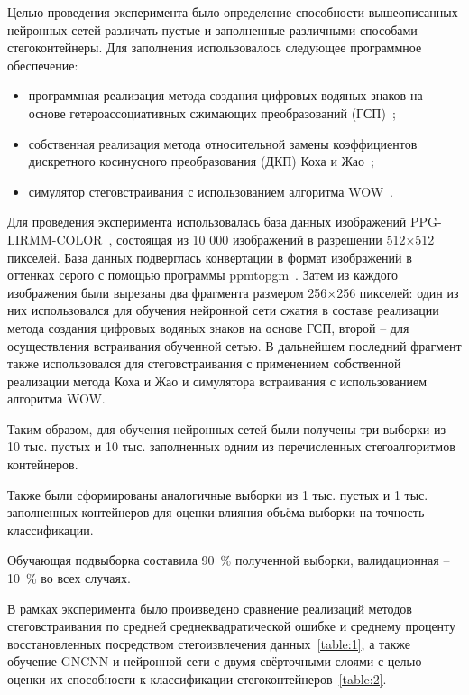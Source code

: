 Целью проведения эксперимента было определение способности вышеописанных нейронных сетей различать пустые и заполненные различными способами стегоконтейнеры. Для заполнения использовалось следующее программное обеспечение:

\begin{itemize}
\item программная реализация метода создания цифровых водяных знаков на основе гетероассоциативных сжимающих преобразований (ГСП)~\cite{SirotaHIC};
\item собственная реализация метода относительной замены коэффициентов дискретного косинусного преобразования (ДКП) Коха и Жао~\cite{ZhaoKoch, KochZhao};
\item симулятор стеговстраивания с использованием алгоритма WOW~\cite{WOW}.
\end{itemize}

Для проведения эксперимента использовалась база данных изображений PPG-LIRMM-COLOR~\cite{PPG-LIRMM-COLOR}, состоящая из 10 000 изображений в разрешении 512×512 пикселей. База данных подверглась конвертации в формат изображений в оттенках серого с помощью программы ppmtopgm~\cite{ppmtopgm}. Затем из каждого изображения были вырезаны два фрагмента размером 256×256 пикселей: один из них использовался для обучения нейронной сети сжатия в составе реализации метода создания цифровых водяных знаков на основе ГСП, второй – для осуществления встраивания обученной сетью. В дальнейшем последний фрагмент также использовался для стеговстраивания с применением собственной реализации метода Коха и Жао и симулятора встраивания с использованием алгоритма WOW.

Таким образом, для обучения нейронных сетей были получены три выборки из 10 тыс. пустых и 10 тыс. заполненных одним из перечисленных стегоалгоритмов контейнеров.

Также были сформированы аналогичные выборки из 1 тыс. пустых и 1 тыс. заполненных контейнеров для оценки влияния объёма выборки на точность классификации.

Обучающая подвыборка составила 90~\% полученной выборки, валидационная – 10~\% во всех случаях.

В рамках эксперимента было произведено сравнение реализаций методов стеговстраивания по средней среднеквадратической ошибке и среднему проценту восстановленных посредством стегоизвлечения данных~\ref{table:1}, а также обучение GNCNN и нейронной сети с двумя свёрточными слоями с целью оценки их способности к классификации стегоконтейнеров~\ref{table:2}.

